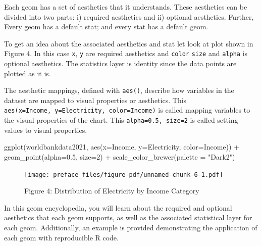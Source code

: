 \documentclass[
  letterpaper,
  DIV=11,
  numbers=noendperiod]{scrreprt}
\newenvironment{Shaded}{\begin{snugshade}}{\end{snugshade}}
\newcommand{\AttributeTok}[1]{\textcolor[rgb]{0.40,0.45,0.13}{#1}}
\newcommand{\DecValTok}[1]{\textcolor[rgb]{0.68,0.00,0.00}{#1}}
\newcommand{\FloatTok}[1]{\textcolor[rgb]{0.68,0.00,0.00}{#1}}
\newcommand{\FunctionTok}[1]{\textcolor[rgb]{0.28,0.35,0.67}{#1}}
\newcommand{\NormalTok}[1]{\textcolor[rgb]{0.00,0.23,0.31}{#1}}
\newcommand{\SpecialCharTok}[1]{\textcolor[rgb]{0.37,0.37,0.37}{#1}}
\newcommand{\StringTok}[1]{\textcolor[rgb]{0.13,0.47,0.30}{#1}}
\begin{document}

Each geom has a set of aesthetics that it understands. These aesthetics
can be divided into two parts: i) required aesthetics and ii) optional
aesthetics. Further, Every geom has a default stat; and every stat has a
default geom.

To get an idea about the associated aesthetics and stat let look at plot
shown in Figure 4. In this case \texttt{x}, \texttt{y} are required
aesthetics and \texttt{color} \texttt{size} and \texttt{alpha} is
optional aesthetics. The statistics layer is identity since the data
points are plotted as it is.

The aesthetic mappings, defined with \texttt{aes()}, describe how
variables in the dataset are mapped to visual properties or aesthetics.
This \texttt{aes(x=Income,\ y=Electricity,\ color=Income)} is called
mapping variables to the visual properties of the chart. This
\texttt{alpha=0.5,\ size=2} is called setting values to visual
properties.

\begin{Shaded}
\begin{Highlighting}[]
\FunctionTok{ggplot}\NormalTok{(worldbankdata2021, }\FunctionTok{aes}\NormalTok{(}\AttributeTok{x=}\NormalTok{Income, }\AttributeTok{y=}\NormalTok{Electricity, }\AttributeTok{color=}\NormalTok{Income)) }\SpecialCharTok{+} 
  \FunctionTok{geom\_point}\NormalTok{(}\AttributeTok{alpha=}\FloatTok{0.5}\NormalTok{, }\AttributeTok{size=}\DecValTok{2}\NormalTok{) }\SpecialCharTok{+}
  \FunctionTok{scale\_color\_brewer}\NormalTok{(}\AttributeTok{palette =} \StringTok{"Dark2"}\NormalTok{)}
\end{Highlighting}
\end{Shaded}

\begin{figure}[H]

{\centering \texttt{[image: preface\_files/figure-pdf/unnamed-chunk-6-1.pdf]}

}

\caption{Figure 4: Distribution of Electricity by Income Category}

\end{figure}%

In this {geom encyclopedia}, you will learn about the required and
optional aesthetics that each geom supports, as well as the associated
statistical layer for each geom. Additionally, an example is provided
demonstrating the application of each geom with reproducible R code.
\end{document}
